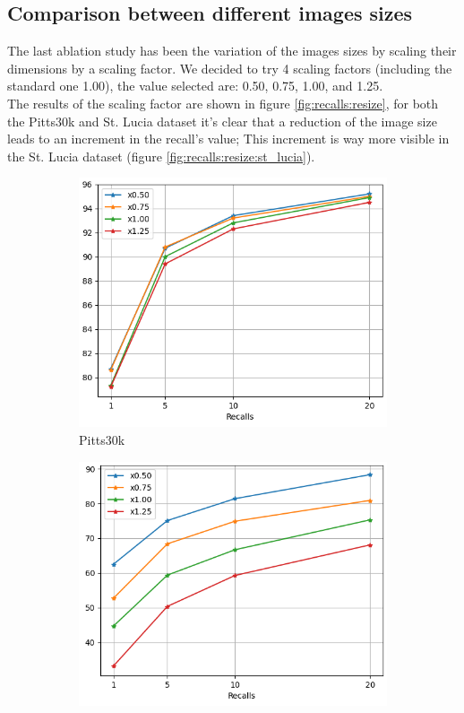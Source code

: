 \documentclass[10pt,twocolumn,letterpaper]{article}
\begin{document}
\subsection{Comparison between different images sizes}
The last ablation study has been the variation of the images sizes by scaling their dimensions by a scaling factor. We decided to try 4 scaling factors (including the standard one 1.00), the value selected are: 0.50, 0.75, 1.00, and 1.25.\\
The results of the scaling factor are shown in figure \ref{fig:recalls:resize}, for both the Pitts30k and St. Lucia dataset it's clear that a reduction of the image size leads to an increment in the recall's value; This increment is way more visible in the St. Lucia dataset (figure \ref{fig:recalls:resize:st_lucia}).
	\begin{figure}[!h]
	\centering
	\begin{subfigure}[b]{0.23\textwidth}
		\centering
		\includegraphics[width=\textwidth]{img/resize/test_pitts30k_recalls_graph.png}
		\caption{Pitts30k}
		\label{fig:recalls:resize:pitts30k}
	\end{subfigure}
	\hfill
	\begin{subfigure}[b]{0.23\textwidth}
		\centering
		\includegraphics[width=\textwidth]{img/resize/test_st_lucia_recalls_graph.png}

\end{subfigure}
\end{figure}
\end{document}
